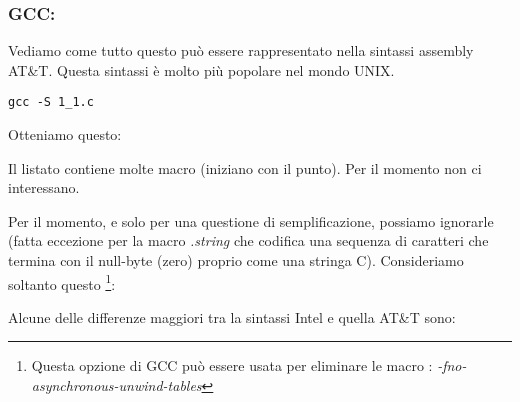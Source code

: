 \subsubsection{GCC: \ATTSyntax}
\label{ATT_syntax}

Vediamo come tutto questo può essere rappresentato nella sintassi assembly AT\&T.
Questa sintassi è molto più popolare nel mondo UNIX.

\begin{lstlisting}[caption=compiliamo in GCC 4.7.3]
gcc -S 1_1.c
\end{lstlisting}

Otteniamo questo:



Il listato contiene molte macro (iniziano con il punto). Per il momento non ci interessano.

Per il momento, e solo per una questione di semplificazione, possiamo ignorarle (fatta eccezione per la macro \emph{.string} che codifica una sequenza di caratteri che termina con il null-byte (zero) proprio come una stringa C). Consideriamo soltanto questo
\footnote{Questa opzione di GCC può essere usata per eliminare le macro : \emph{-fno-asynchronous-unwind-tables}}:



\myindex{\ATTSyntax}
\myindex{\IntelSyntax}
Alcune delle differenze maggiori tra la sintassi Intel e quella AT\&T sono:

